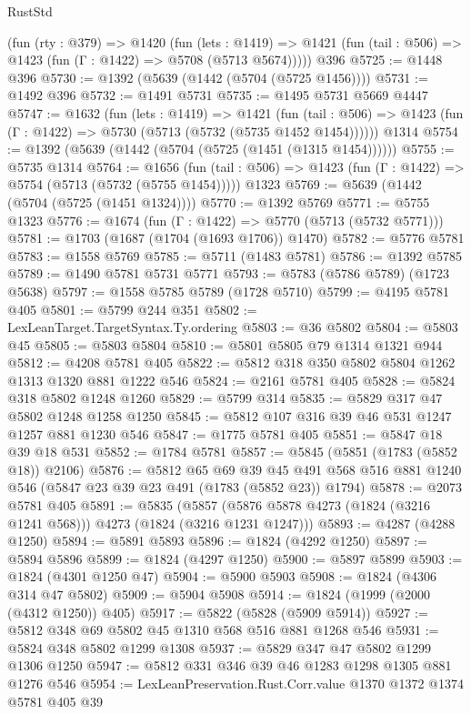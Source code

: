 \begin{lexlean}{RustStd}
\begin{coremodule}
    (fun (rty : @379) =>
    @1420
      (fun (lets : @1419) =>
      @1421 (fun (tail : @506) => @1423 (fun (Γ : @1422) => @5708 (@5713 @5674)))))
    @396
@5725 := @1448 @396
@5730 := @1392 (@5639 (@1442 (@5704 (@5725 @1456))))
@5731 := @1492 @396
@5732 := @1491 @5731
@5735 := @1495 @5731 @5669 @4447
@5747 := @1632
    (fun (lets : @1419) =>
    @1421
      (fun (tail : @506) => @1423 (fun (Γ : @1422) => @5730 (@5713 (@5732 (@5735 @1452 @1454))))))
    @1314
@5754 := @1392 (@5639 (@1442 (@5704 (@5725 (@1451 (@1315 @1454))))))
@5755 := @5735 @1314
@5764 := @1656
    (fun (tail : @506) => @1423 (fun (Γ : @1422) => @5754 (@5713 (@5732 (@5755 @1454)))))
    @1323
@5769 := @5639 (@1442 (@5704 (@5725 (@1451 @1324))))
@5770 := @1392 @5769
@5771 := @5755 @1323
@5776 := @1674 (fun (Γ : @1422) => @5770 (@5713 (@5732 @5771)))
@5781 := @1703 (@1687 (@1704 (@1693 @1706)) @1470)
@5782 := @5776 @5781
@5783 := @1558 @5769
@5785 := @5711 (@1483 @5781)
@5786 := @1392 @5785
@5789 := @1490 @5781 @5731 @5771
@5793 := @5783 (@5786 @5789) (@1723 @5638)
@5797 := @1558 @5785 @5789 (@1728 @5710)
@5799 := @4195 @5781 @405
@5801 := @5799 @244 @351
@5802 := LexLeanTarget.TargetSyntax.Ty.ordering
@5803 := @36 @5802
@5804 := @5803 @45
@5805 := @5803 @5804
@5810 := @5801 @5805 @79 @1314 @1321 @944
@5812 := @4208 @5781 @405
@5822 := @5812 @318 @350 @5802 @5804 @1262 @1313 @1320 @881 @1222 @546
@5824 := @2161 @5781 @405
@5828 := @5824 @318 @5802 @1248 @1260
@5829 := @5799 @314
@5835 := @5829 @317 @47 @5802 @1248 @1258 @1250
@5845 := @5812 @107 @316 @39 @46 @531 @1247 @1257 @881 @1230 @546
@5847 := @1775 @5781 @405
@5851 := @5847 @18 @39 @18 @531
@5852 := @1784 @5781
@5857 := @5845 (@5851 (@1783 (@5852 @18)) @2106)
@5876 := @5812
    @65
    @69
    @39
    @45
    @491
    @568
    @516
    @881
    @1240
    @546
    (@5847 @23 @39 @23 @491 (@1783 (@5852 @23)) @1794)
@5878 := @2073 @5781 @405
@5891 := @5835
    (@5857 (@5876 @5878 @4273 (@1824 (@3216 @1241 @568))) @4273 (@1824 (@3216 @1231 @1247)))
@5893 := @4287 (@4288 @1250)
@5894 := @5891 @5893
@5896 := @1824 (@4292 @1250)
@5897 := @5894 @5896
@5899 := @1824 (@4297 @1250)
@5900 := @5897 @5899
@5903 := @1824 (@4301 @1250 @47)
@5904 := @5900 @5903
@5908 := @1824 (@4306 @314 @47 @5802)
@5909 := @5904 @5908
@5914 := @1824 (@1999 (@2000 (@4312 @1250)) @405)
@5917 := @5822 (@5828 (@5909 @5914))
@5927 := @5812 @348 @69 @5802 @45 @1310 @568 @516 @881 @1268 @546
@5931 := @5824 @348 @5802 @1299 @1308
@5937 := @5829 @347 @47 @5802 @1299 @1306 @1250
@5947 := @5812 @331 @346 @39 @46 @1283 @1298 @1305 @881 @1276 @546
@5954 := LexLeanPreservation.Rust.Corr.value @1370 @1372 @1374 @5781 @405 @39

\end{coremodule}
\end{lexlean}
